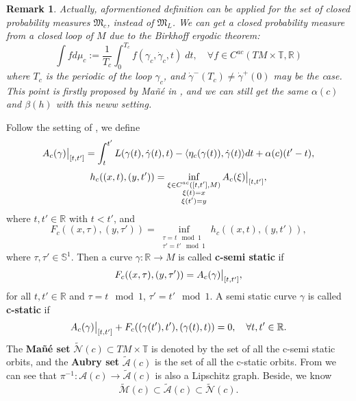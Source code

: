 \documentclass{amsart}
\newtheorem{rmk}[thm]{Remark}
\begin{document}
\begin{rmk}
Actually, aformentioned definition can be applied for the set of closed probability measures $\mathfrak{M}_c$, instead of $\mathfrak{M}_L$. We can get a closed probability measure from a closed loop of $M$ due to the Birkhoff ergodic theorem:
\[
\int f d\mu_c:=\frac{1}{T_c}\int_0^{T_c}f(\gamma_c,\dot{\gamma}_c,t)\;dt,\quad\forall f\in C^{ac}(TM\times{\mathbb{T}},{\mathbb{R}})
\]
where $T_c$ is the periodic of the loop $\gamma_c$, and $\dot\gamma^-(T_c)\neq\dot\gamma^+(0)$ may be the case. This point is firstly proposed by Ma\~{n}\'e in \cite{Mn}, and we can still get the same $\alpha(c)$ and $\beta(h)$ with this neww setting.
\end{rmk}

Follow the setting of \cite{B}, we define
\begin{equation}
A_c(\gamma)\big{|}_{[t,t']}=\int_t^{t'}L(\gamma(t),\dot{\gamma}(t),t)-\langle\eta_c(\gamma(t)),\dot{\gamma}(t)\rangle dt+\alpha(c)(t'-t),
\end{equation}
\begin{equation}
h_c((x,t),(y,t'))=\inf_{\substack{\xi\in C^{ac}([t,t'],M)\\
\xi(t)=x\\
\xi(t')=y}}A_c(\xi)\big{|}_{[t,t']},
\end{equation}
where $t,t'\in\mathbb{R}$ with $t<t'$, and
\begin{equation}
F_c((x,\tau),(y,\tau'))=\inf_{\substack{\tau=t\mod1\\
\tau'=t'\mod1}}h_c((x,t),(y,t')),
\end{equation}
where $\tau,\tau'\in\mathbb{S}^1$. Then a curve $\gamma:\mathbb{R}\rightarrow M$ is called {\bf c-semi static} if 
\[
F_c((x,\tau),(y,\tau'))=A_c(\gamma)\big{|}_{[t,t']},
\]
for all $t,t'\in\mathbb{R}$ and $\tau=t\mod1$, $\tau'=t'\mod1$. A semi static curve $\gamma$ is called {\bf c-static} if
\[
A_c(\gamma)\big{|}_{[t,t']}+F_c((\gamma(t'),t'),(\gamma(t),t))=0,\quad\forall t,t'\in\mathbb{R}.
\]
The {\bf Ma\~{n}\'e set} $\widetilde{\mathcal{N}}(c)\subset TM\times{\mathbb{T}}$ is denoted by the set of all the c-semi static orbits, and the {\bf Aubry set} $\tilde{\mathcal{A}}(c)$ is the set of all the c-static orbits. From \cite{B} we can see that $\pi^{-1}:\mathcal{A}(c)\rightarrow \tilde{\mathcal{A}}(c)$ is also a Lipschitz graph. Beside, we know
\[
\widetilde{\mathcal{M}}(c)\subset\tilde{\mathcal{A}}(c)\subset\widetilde{\mathcal{N}}(c).
\]
\vspace{10pt}
\end{document}
